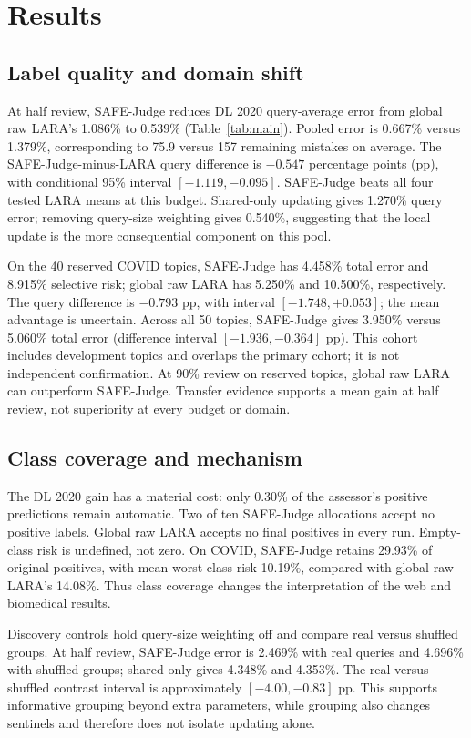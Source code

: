 \documentclass[sigconf,nonacm]{acmart}
\begin{document}
\section{Results}
\subsection{Label quality and domain shift}
At half review, SAFE-Judge reduces DL 2020 query-average error from
global raw LARA's 1.086\% to 0.539\% (Table~\ref{tab:main}). Pooled error is
0.667\% versus 1.379\%, corresponding to 75.9 versus 157 remaining mistakes on
average. The SAFE-Judge-minus-LARA query difference is $-0.547$ percentage points
(pp), with conditional 95\% interval $[-1.119,-0.095]$. SAFE-Judge beats all four
tested LARA means at this budget. Shared-only updating gives 1.270\% query error;
removing query-size weighting gives 0.540\%, suggesting that the local update
is the more consequential component on this pool.

On the 40 reserved COVID topics, SAFE-Judge has 4.458\% total error and
8.915\% selective risk; global raw LARA has 5.250\% and 10.500\%, respectively.
The query difference is $-0.793$ pp, with interval $[-1.748,+0.053]$; the
mean advantage is uncertain. Across all 50 topics, SAFE-Judge gives 3.950\%
versus 5.060\% total error (difference interval $[-1.936,-0.364]$ pp).
This cohort includes development topics and overlaps the primary cohort;
it is not independent confirmation. At 90\% review on reserved topics,
global raw LARA can outperform SAFE-Judge. Transfer evidence supports a mean
gain at half review, not superiority at every budget or domain.

\subsection{Class coverage and mechanism}
The DL 2020 gain has a material cost: only 0.30\% of the assessor's positive
predictions remain automatic. Two of ten SAFE-Judge allocations accept no positive
labels. Global raw LARA accepts no final positives in every run. Empty-class
risk is undefined, not zero. On COVID, SAFE-Judge retains 29.93\% of original
positives, with mean worst-class risk 10.19\%, compared with global raw LARA's
14.08\%. Thus class coverage changes the interpretation of the web and
biomedical results.

Discovery controls hold query-size weighting off and compare real versus
shuffled groups. At half review, SAFE-Judge error is 2.469\% with real queries and
4.696\% with shuffled groups; shared-only gives 4.348\% and 4.353\%.
The real-versus-shuffled contrast interval is approximately $[-4.00,-0.83]$ pp. This supports
informative grouping beyond extra parameters, while grouping also changes
sentinels and therefore does not isolate updating alone.
\end{document}
